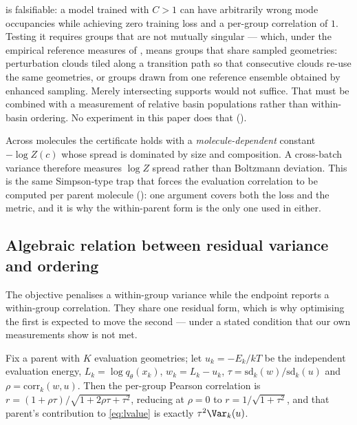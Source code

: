\begin{remark}
\label{rem:l2g-design}
 is falsifiable: a model trained with $C > 1$ can have arbitrarily
wrong mode occupancies while achieving zero training loss and a per-group
correlation of $1$. Testing it requires groups that are not mutually singular ---
which, under the empirical reference measures of , means groups
that share sampled geometries: perturbation clouds tiled along a transition path so
that consecutive clouds re-use the same geometries, or groups drawn from one
reference ensemble obtained by enhanced sampling. Merely intersecting supports would
not suffice. That must be combined with a measurement of relative basin populations
rather than within-basin ordering. No experiment in this
paper does that ().
\end{remark}

\begin{remark}
\label{rem:crossbatch}
Across molecules the certificate holds with a \emph{molecule-dependent} constant
$-\log Z(c)$ whose spread is dominated by size and composition. A cross-batch
variance therefore measures $\log Z$ spread rather than Boltzmann deviation. This
is the same Simpson-type trap that forces the evaluation correlation to be computed
per parent molecule (): one argument covers both the loss and the
metric, and it is why the within-parent form is the only one used in either.
\end{remark}

\subsection{Algebraic relation between residual variance and ordering}
\label{app:surrogate}

The objective penalises a within-group variance while the endpoint reports a
within-group correlation. They share one residual form, which is why optimising the
first is expected to move the second --- under a stated condition that our own
measurements show is not met.

\begin{proposition}
\label{prop:surrogate}
Fix a parent with $K$ evaluation geometries; let $u_k = -E_k/kT$ be the independent
evaluation energy, $L_k = \log q_\theta(x_k)$, $w_k = L_k - u_k$,
$\tau = \mathrm{sd}_k(w)/\mathrm{sd}_k(u)$ and $\rho = \mathrm{corr}_k(w,u)$. Then the
per-group Pearson correlation is $r = (1+\rho\tau)/\sqrt{1+2\rho\tau+\tau^2}$, reducing at
$\rho = 0$ to $r = 1/\sqrt{1+\tau^2}$, and that parent's contribution to \eqref{eq:lvalue}
is exactly $\tau^2\Var_k(u)$.
\end{proposition}

